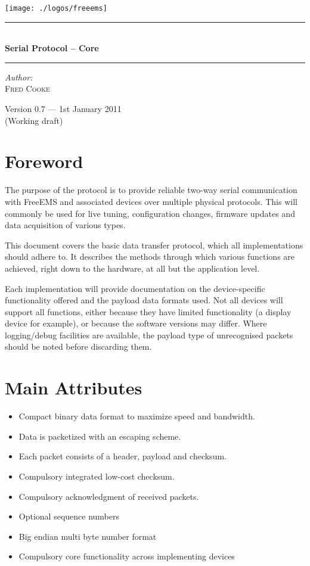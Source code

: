 \documentclass[12pt,a4paper,titlepage]{article}
\newcommand{\HRule}{\rule{\linewidth}{0.5mm}}
\begin{document}
\begin{titlepage} 
\begin{center}

\texttt{[image: ./logos/freeems]}\\[1cm] \vfill

\HRule \\[0.8cm]
{ \huge \bfseries Serial Protocol -- Core}\\[0.4cm]
\HRule \vfill

\Large \emph{Author:}\\
\textsc{Fred Cooke} \vfill

{\large Version 0.7 --- 1st January 2011\\
(Working draft)}

\end{center}
\end{titlepage} 


\tableofcontents
\thispagestyle{empty}
\pagebreak

\section {Foreword}

The purpose of the protocol is to provide reliable two-way serial communication
with FreeEMS and associated devices over multiple physical protocols. This will
commonly be used for live tuning, configuration changes, firmware updates and
data acquisition of various types.

This document covers the basic data transfer protocol, which all
implementations should adhere to. It describes the methods through which
various functions are achieved, right down to the hardware, at all but the
application level.

Each implementation will provide documentation on the device-specific
functionality offered and the payload data formats used. Not all devices
will support all functions, either because they have limited functionality
(a display device for example), or because the software versions may differ.
Where logging/debug facilities are available, the payload type of unrecognised
packets should be noted before discarding them.

\section {Main Attributes}
\begin{itemize}
\item Compact binary data format to maximize speed and bandwidth.
\item Data is packetized with an escaping scheme.
\item Each packet consists of a header, payload and checksum.
\item Compulsory integrated low-cost checksum.
\item Compulsory acknowledgment of received packets.
\item Optional sequence numbers
\item Big endian multi byte number format
\item Compulsory core functionality across implementing devices
\end{itemize}
\end{document}
